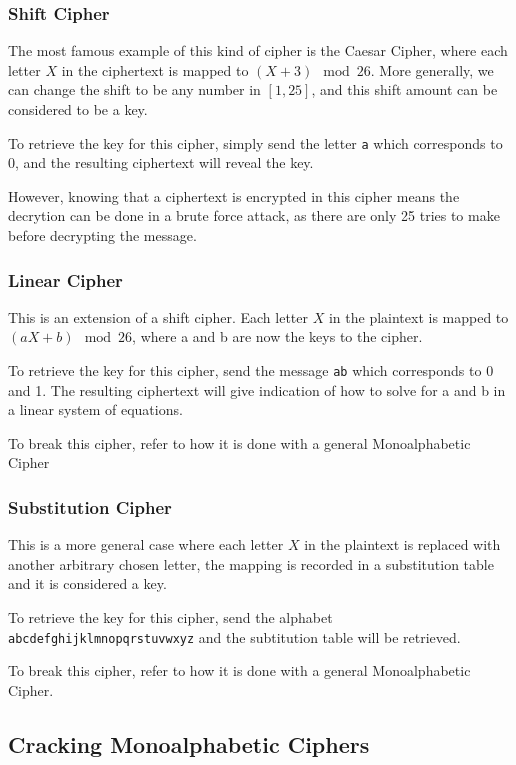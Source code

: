\documentclass{article}
\begin{document}
\begin{multicols}{2}
\subsubsection{Shift Cipher}

The most famous example of this kind of cipher is the Caesar Cipher, where each letter $X$ in the ciphertext is mapped to $(X + 3) \mod 26$. More generally, we can change the shift to be any number in $[1,25]$, and this shift amount can be considered to be a key. 

To retrieve the key for this cipher, simply send the letter \texttt{a} which corresponds to 0, and the resulting ciphertext will reveal the key.

However, knowing that a ciphertext is encrypted in this cipher means the decrytion can be done in a brute force attack, as there are only 25 tries to make before decrypting the message.

\subsubsection{Linear Cipher}

This is an extension of a shift cipher. Each letter $X$ in the plaintext is mapped to $(aX + b) \mod 26$, where a and b are now the keys to the cipher.

To retrieve the key for this cipher, send the message \texttt{ab} which corresponds to 0 and 1. The resulting ciphertext will give indication of how to solve for a and b in a linear system of equations.

To break this cipher, refer to how it is done with a general Monoalphabetic Cipher

\subsubsection{Substitution Cipher}

This is a more general case where each letter $X$ in the plaintext is replaced with another arbitrary chosen letter, the mapping is recorded in a substitution table and it is considered a key.

To retrieve the key for this cipher, send the alphabet \texttt{abcdefghijklmnopqrstuvwxyz} and the subtitution table will be retrieved.

To break this cipher, refer to how it is done with a general Monoalphabetic Cipher.

\subsection{Cracking Monoalphabetic Ciphers}


\end{multicols}
\end{document}
